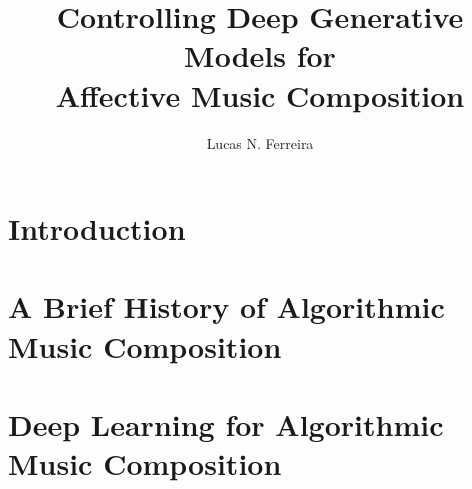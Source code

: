 \documentclass[11pt]{ucscthesis}
\begin{document}

\title{Controlling Deep Generative Models for \\ Affective Music Composition}
\author{Lucas N. Ferreira}
\deanlinethree{}

\begin{frontmatter}

\maketitle
\copyrightpage

\tableofcontents
\listoffigures
\listoftables

\begin{abstract}

\end{abstract}

\begin{dedication}

\end{dedication}

\begin{acknowledgements}

\end{acknowledgements}

\end{frontmatter}


\chapter{Introduction}
\label{ch:intro}


\chapter{A Brief History of Algorithmic Music Composition}
\label{ch:amc}


\chapter{Deep Learning for Algorithmic Music Composition}
\label{ch:ml}

\end{document}
